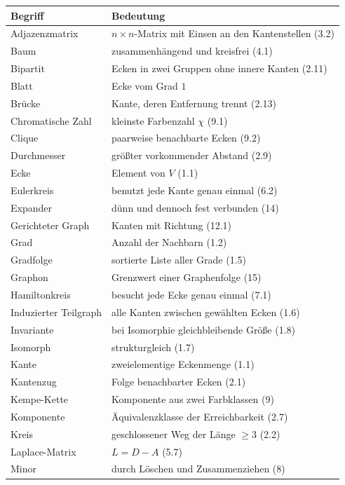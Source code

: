 \begin{merksatz}
\begin{center}
{\small
\renewcommand{\arraystretch}{1.32}
\begin{longtable}{@{}P{3.0cm}P{5.6cm}@{}}
\toprule
\textbf{Begriff} & \textbf{Bedeutung}\\
\midrule
\endhead
Adjazenzmatrix & $n\times n$-Matrix mit Einsen an den Kantenstellen (3.2)\\
Baum & zusammenhängend und kreisfrei (4.1)\\
Bipartit & Ecken in zwei Gruppen ohne innere Kanten (2.11)\\
Blatt & Ecke vom Grad $1$\\
Brücke & Kante, deren Entfernung trennt (2.13)\\
Chromatische Zahl & kleinste Farbenzahl $\chi$ (9.1)\\
Clique & paarweise benachbarte Ecken (9.2)\\
Durchmesser & größter vorkommender Abstand (2.9)\\
Ecke & Element von $V$ (1.1)\\
Eulerkreis & benutzt jede Kante genau einmal (6.2)\\
Expander & dünn und dennoch fest verbunden (14)\\
Gerichteter Graph & Kanten mit Richtung (12.1)\\
Grad & Anzahl der Nachbarn (1.2)\\
Gradfolge & sortierte Liste aller Grade (1.5)\\
Graphon & Grenzwert einer Graphenfolge (15)\\
Hamiltonkreis & besucht jede Ecke genau einmal (7.1)\\
Induzierter Teilgraph & alle Kanten zwischen gewählten Ecken (1.6)\\
Invariante & bei Isomorphie gleichbleibende Größe (1.8)\\
Isomorph & strukturgleich (1.7)\\
Kante & zweielementige Eckenmenge (1.1)\\
Kantenzug & Folge benachbarter Ecken (2.1)\\
Kempe-Kette & Komponente aus zwei Farbklassen (9)\\
Komponente & Äquivalenzklasse der Erreichbarkeit (2.7)\\
Kreis & geschlossener Weg der Länge $\ge 3$ (2.2)\\
Laplace-Matrix & $L = D - A$ (5.7)\\
Minor & durch Löschen und Zusammenziehen (8)\\

\end{longtable}}
\end{center}
\end{merksatz}
